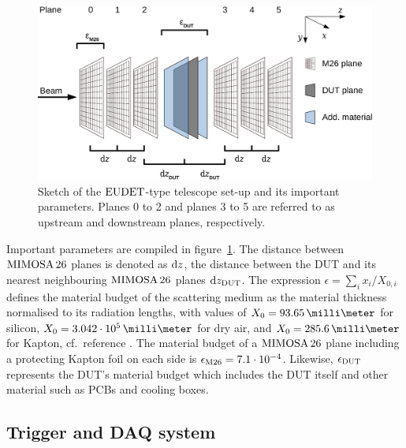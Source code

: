 \begin{figure}[tb]
	\center
	\includegraphics[width=.9\textwidth]{figures/sketch_tscope4}
	\caption[Sketch of the $\DESY$-type telescope set-up]{Sketch of the $\DESY$-type telescope set-up and its important parameters.
	Planes 0 to 2 and planes 3 to 5 are referred to as upstream and downstream planes, respectively.}
	\label{fig:datura_sketch}
\end{figure}

Important parameters are compiled in figure~\ref{fig:datura_sketch}. 
The distance between $\textrm{MIMOSA\,26}$ planes is denoted as $\textrm{d}z$, the distance between the DUT and its nearest neighbouring $\textrm{MIMOSA\,26}$ planes $\textrm{d}z_{\textrm{DUT}}$. 
The expression $\epsilon = \sum_i x_{i}/X_{0,i}$ defines the material budget of the scattering medium as the material thickness normalised to its radiation lengths,
 with values of $X_0 = 93.65\,\milli\meter$ for silicon, $X_0 = 3.042\cdot 10^{5}\,\milli\meter$ for dry air, and $X_0 = 285.6\,\milli\meter$ for Kapton, cf.~reference \cite{ref:x0values}.
The material budget of a $\textrm{MIMOSA\,26}$ plane including a protecting Kapton foil on each side is $\mathnormal{\epsilon_{\textrm{M26}}} = 7.1\cdot10^{-4}$. 
Likewise, $\mathnormal{\epsilon_{\textrm{DUT}}}$ represents the DUT's material budget which includes the DUT itself and other material such as PCBs and cooling boxes.

\subsection{Trigger and DAQ system}
\label{sec:tdaq}

